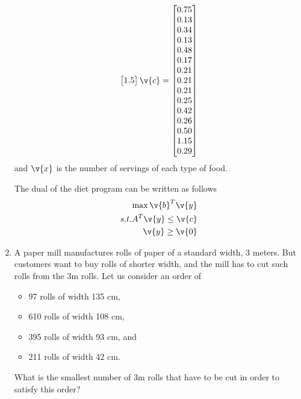 \documentclass[11pt, oneside]{article}
\begin{document}
\begin{enumerate}
\begin{align*}
\begin{bmatrix}
                 1.5
            \end{bmatrix}
            \v{c} =
            \begin{bmatrix}
                0.75 \\ %
                0.13 \\ %
                0.34 \\ %
                0.13 \\ %
                0.48 \\ %
                0.17 \\ %
                0.21 \\ %
                0.21 \\ %
                0.21 \\ %
                0.25 \\ %
                0.42 \\ %
                0.26 \\ %
                0.50 \\ %
                1.15 \\ %
                0.29    %
            \end{bmatrix}
        \end{align*}
        and $\v{x}$ is the number of servings of each type of food.

        The dual of the diet program can be written as follows
        \begin{align*}
            \max \v{b}^T \v{y} \\
            s.t. A^T \v{y} \le \v{c} \\
            \v{y} \ge \v{0}
        \end{align*}

    \item %
        A paper mill manufactures rolls of paper of a standard width, 3 meters.
        But customers want to buy rolls of shorter width, and the mill has to
        cut such rolls from the 3m rolls.
        Let us consider an order of
        \begin{itemize}
            \item 97 rolls of width 135 cm,
            \item 610 rolls of width 108 cm,
            \item 395 rolls of width 93 cm, and
            \item 211 rolls of width 42 cm.
        \end{itemize}
        What is the smallest number of 3m rolls that have to be cut in order to
        satisfy this order?


\end{enumerate}
\end{document}
